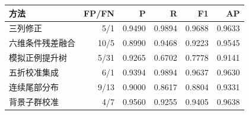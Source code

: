 \begin{tabular}{@{}lrrrrr@{}}\toprule
方法 & FP/FN & P & R & F1 & AP \\\midrule
三列修正 & 5/1 & 0.9490 & 0.9894 & 0.9688 & 0.9633 \\
六维条件残差融合 & 10/5 & 0.8990 & 0.9468 & 0.9223 & 0.9545 \\
模拟正例提升树 & 5/31 & 0.9265 & 0.6702 & 0.7778 & 0.9141 \\
五折校准集成 & 6/1 & 0.9394 & 0.9894 & 0.9637 & 0.9630 \\
连续尾部分布 & 9/13 & 0.9000 & 0.8617 & 0.8804 & 0.9331 \\
背景子群校准 & 4/7 & 0.9560 & 0.9255 & 0.9405 & 0.9638 \\
\bottomrule\end{tabular}
